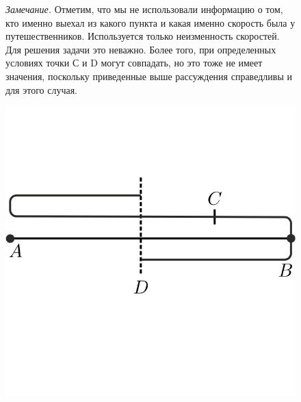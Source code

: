 \begin{figure}[h!]
\begin{minipage}{0.69\linewidth}\setlength{\parindent}{1.5em}
\textit{Замечание.} Отметим, что мы не использовали информацию о том, кто именно выехал из какого пункта и какая именно скорость была у путешественников. Используется только неизменность скоростей. Для решения задачи это неважно. Более того, при определенных условиях точки С и D могут совпадать, но это тоже не имеет значения, поскольку приведенные выше рассуждения справедливы и для этого случая.
\end{minipage}
\hfill 
\begin{minipage}{0.3\linewidth}\setlength{\parindent}{1.5em}
    \includegraphics[scale=0.7]{./img/ABC}
\end{minipage}
\end{figure}
